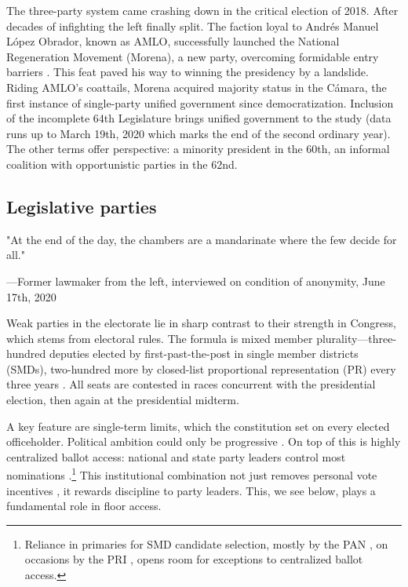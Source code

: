 \documentclass[letter,12pt]{article}
\begin{document}
The three-party system came crashing down in the critical election of 2018. After decades of infighting the left finally split. The faction loyal to Andrés Manuel López Obrador, known as AMLO, successfully launched the National Regeneration Movement (Morena), a new party, overcoming formidable entry barriers \citep{magar.2007ref.2015}. This feat paved his way to winning the presidency by a landslide. Riding AMLO's coattails, Morena acquired majority status in the Cámara, the first instance of single-party unified government since democratization. Inclusion of the incomplete 64th Legislature brings unified government to the study (data runs up to March 19th, 2020 which marks the end of the second ordinary year). The other terms offer perspective: a minority president in the 60th, an informal coalition with opportunistic parties in the 62nd. 



\subsection{Legislative parties}
\singlespacing
\epigraph{"At the end of the day, the chambers are a mandarinate where the few decide for all."}%
{---Former lawmaker from the left, interviewed on condition of anonymity, June 17th, 2020}
\doublespacing

Weak parties in the electorate lie in sharp contrast to their strength in Congress, which stems from electoral rules. The formula is mixed member plurality---three-hundred deputies elected by first-past-the-post in single member districts (SMDs), two-hundred more by closed-list proportional representation (PR) every three years \citep{weldonMixedMemberSys2001}. All seats are contested in races concurrent with the presidential election, then again at the presidential midterm.

A key feature are single-term limits, which the constitution set on every elected officeholder. Political ambition could only be progressive \citep{schlesinger.1966}. On top of this is highly centralized ballot access: national and state party leaders control most nominations \citep{rosas.langston.2011,langston.2008}.\footnote{Reliance in primaries for SMD candidate selection, mostly by the PAN \citep{ascencio.kerevel.cand-sel-beh.2021}, on occasions by the PRI \citep{poire.phd.2002}, opens room for exceptions to centralized ballot access.} This institutional combination not just removes personal vote incentives \citep{carey.shugart.1995}, it rewards discipline to party leaders. This, we see below, plays a fundamental role in floor access. 
\end{document}
